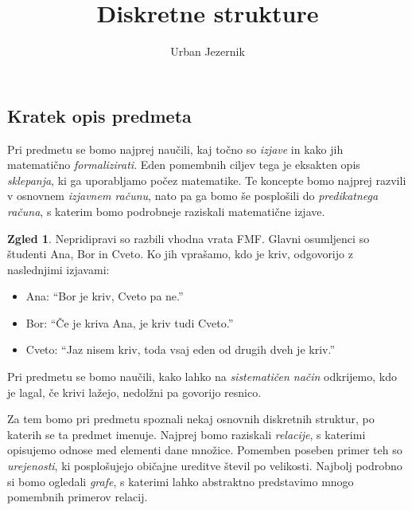 \documentclass[11pt]{book}
\title{\bf Diskretne strukture}
\author{Urban Jezernik}
\theoremstyle{definition}
\theoremstyle{zgled}
\newtheorem*{zgled}{Zgled}
\theoremstyle{odprtproblem}
\theoremstyle{domacanaloga}
\theoremstyle{izrek}
\begin{document}
\baselineskip=14pt

\maketitle

\setcounter{tocdepth}{1}
\tableofcontents

\newpage

\subsection*{Kratek opis predmeta}

Pri predmetu se bomo najprej naučili, kaj točno so \emph{izjave} in kako jih matematično \emph{formalizirati}. Eden pomembnih ciljev tega je eksakten opis  \emph{sklepanja}, ki ga uporabljamo počez matematike. Te koncepte bomo najprej razvili v osnovnem \emph{izjavnem računu}, nato pa ga bomo še posplošili do \emph{predikatnega računa}, s katerim bomo podrobneje raziskali matematične izjave. 

\begin{zgled}
Nepridipravi so razbili vhodna vrata FMF. Glavni osumljenci so študenti Ana, Bor in Cveto. Ko jih vprašamo, kdo je kriv, odgovorijo z naslednjimi izjavami:

\begin{itemize}
    \item Ana: ``Bor je kriv, Cveto pa ne.''
    \item Bor: ``Če je kriva Ana, je kriv tudi Cveto.''
    \item Cveto: ``Jaz nisem kriv, toda vsaj eden od drugih dveh je kriv.''
\end{itemize}

Pri predmetu se bomo naučili, kako lahko na \emph{sistematičen način} odkrijemo, kdo je lagal, če krivi lažejo, nedolžni pa govorijo resnico.
\end{zgled}

Za tem bomo pri predmetu spoznali nekaj osnovnih diskretnih struktur, po katerih se ta predmet imenuje. Najprej bomo raziskali \emph{relacije}, s katerimi opisujemo odnose med elementi dane množice. Pomemben poseben primer teh so \emph{urejenosti}, ki posplošujejo običajne ureditve števil po velikosti. Najbolj podrobno si bomo ogledali \emph{grafe}, s katerimi lahko abstraktno predstavimo mnogo pomembnih primerov relacij.
\end{document}
